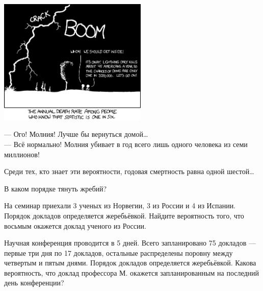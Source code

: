 \documentclass[pdftex,unicode]{beamer}
\begin{document}
\begin{frame}[plain]

\begin{center}
\includegraphics[height=60mm]{conditional_risk.png}
\end{center}

--- Ого! Молния! Лучше бы вернуться домой\ldots \\
--- Всё нормально! Молния убивает в год всего лишь одного человека из семи миллионов! 
\vspace{5pt}

\footnotesize{Среди тех, кто знает эти вероятности, годовая смертность равна одной шестой\ldots}



\end{frame}


\begin{frame}{В каком порядке тянуть жребий?}

\begin{block}{}
На семинар приехали 3 ученых из Норвегии, 3 из России и 4 из Испании. Порядок докладов определяется жеребьёвкой. Найдите вероятность того, что восьмым окажется доклад ученого из России.
\end{block}

\begin{block}{}
Научная конференция проводится в 5 дней. Всего запланировано 75 докладов — первые три дня по 17 докладов, остальные распределены поровну между четвертым и пятым днями. Порядок докладов определяется жеребьёвкой. Какова вероятность, что доклад профессора М. окажется запланированным на последний день конференции?
\end{block}

\end{frame}
\end{document}
